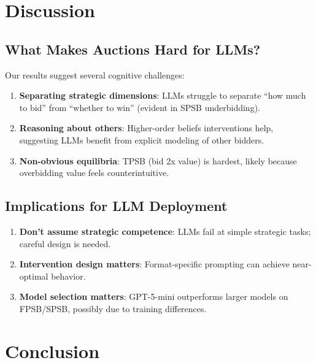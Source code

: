 \documentclass[12pt]{article}
\begin{document}
\section{Discussion}

\subsection{What Makes Auctions Hard for LLMs?}

Our results suggest several cognitive challenges:

\begin{enumerate}
    \item \textbf{Separating strategic dimensions}: LLMs struggle to separate ``how much to bid'' from ``whether to win'' (evident in SPSB underbidding).

    \item \textbf{Reasoning about others}: Higher-order beliefs interventions help, suggesting LLMs benefit from explicit modeling of other bidders.

    \item \textbf{Non-obvious equilibria}: TPSB (bid 2x value) is hardest, likely because overbidding value feels counterintuitive.
\end{enumerate}

\subsection{Implications for LLM Deployment}

\begin{enumerate}
    \item \textbf{Don't assume strategic competence}: LLMs fail at simple strategic tasks; careful design is needed.

    \item \textbf{Intervention design matters}: Format-specific prompting can achieve near-optimal behavior.

    \item \textbf{Model selection matters}: GPT-5-mini outperforms larger models on FPSB/SPSB, possibly due to training differences.
\end{enumerate}

\section{Conclusion}
\end{document}
